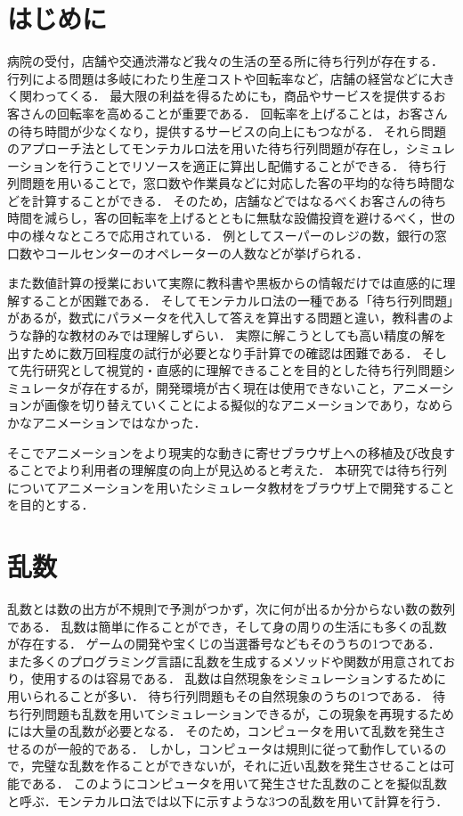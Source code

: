 \documentclass[12pt,a4j]{ltjsarticle}
\begin{document}
\section{はじめに}
病院の受付，店舗や交通渋滞など我々の生活の至る所に待ち行列が存在する．
行列による問題は多岐にわたり生産コストや回転率など，店舗の経営などに大きく関わってくる．
最大限の利益を得るためにも，商品やサービスを提供するお客さんの回転率を高めることが重要である．
回転率を上げることは，お客さんの待ち時間が少なくなり，提供するサービスの向上にもつながる．
それら問題のアプローチ法としてモンテカルロ法を用いた待ち行列問題が存在し，シミュレーションを行うことでリソースを適正に算出し配備することができる．
待ち行列問題を用いることで，窓口数や作業員などに対応した客の平均的な待ち時間などを計算することができる．
そのため，店舗などではなるべくお客さんの待ち時間を減らし，客の回転率を上げるとともに無駄な設備投資を避けるべく，世の中の様々なところで応用されている．
例としてスーパーのレジの数，銀行の窓口数やコールセンターのオペレーターの人数などが挙げられる\cite{soumu}．

また数値計算の授業において実際に教科書や黒板からの情報だけでは直感的に理解することが困難である．
そしてモンテカルロ法の一種である「待ち行列問題」があるが，数式にパラメータを代入して答えを算出する問題と違い，教科書のような静的な教材のみでは理解しずらい．
実際に解こうとしても高い精度の解を出すために数万回程度の試行が必要となり手計算での確認は困難である．
そして先行研究として視覚的・直感的に理解できることを目的とした待ち行列問題シミュレータが存在するが，開発環境が古く現在は使用できないこと，アニメーションが画像を切り替えていくことによる擬似的なアニメーションであり，なめらかなアニメーションではなかった\cite{sotuken16}．

そこでアニメーションをより現実的な動きに寄せブラウザ上への移植及び改良することでより利用者の理解度の向上が見込めると考えた．
本研究では待ち行列についてアニメーションを用いたシミュレータ教材をブラウザ上で開発することを目的とする．
\clearpage

\section{乱数}
乱数とは数の出方が不規則で予測がつかず，次に何が出るか分からない数の数列である．
乱数は簡単に作ることができ，そして身の周りの生活にも多くの乱数が存在する．
ゲームの開発や宝くじの当選番号などもそのうちの1つである．
また多くのプログラミング言語に乱数を生成するメソッドや関数が用意されており，使用するのは容易である．
乱数は自然現象をシミュレーションするために用いられることが多い．
待ち行列問題もその自然現象のうちの1つである．
待ち行列問題も乱数を用いてシミュレーションできるが，この現象を再現するためには大量の乱数が必要となる．
そのため，コンピュータを用いて乱数を発生させるのが一般的である．
しかし，コンピュータは規則に従って動作しているので，完璧な乱数を作ることができないが，それに近い乱数を発生させることは可能である．
このようにコンピュータを用いて発生させた乱数のことを擬似乱数と呼ぶ．モンテカルロ法では以下に示すような3つの乱数を用いて計算を行う．
\end{document}
